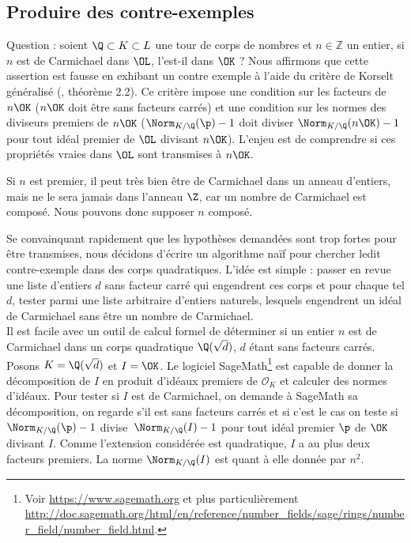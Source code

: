 \documentclass[a4paper, 12pt, oneside]{article}
\begin{document}
\begin{appendix}
\section{Produire des contre-exemples}

Question : soient $\Q \subset K \subset L$ une tour de corps de nombres et $n\in \mathbb{Z}$ un entier, si $n$ est de Carmichael dans $\OL$, l'est-il dans $\OK$ ? Nous affirmons que cette assertion est fausse en exhibant un contre exemple à l'aide du critère de Korselt généralisé (\cite{article}, théorème 2.2). Ce critère impose une condition sur les facteurs de $n\OK$ ($n\OK$ doit être sans facteurs carrés) et une condition sur les normes des diviseurs premiers de $n\OK$ ($\Norm_{K/\Q}(\p)-1$ doit diviser $\Norm_{K/\Q}(n\OK) - 1$ pour tout idéal premier de $\OL$ divisant $n\OK$). L'enjeu est de comprendre si ces propriétés vraies dans $\OL$ sont transmises à $n\OK$.

\begin{remarque}Si $n$ est premier, il peut très bien être de Carmichael dans un anneau d'entiers, mais ne le sera jamais dans l'anneau $\Z$, car un nombre de Carmichael est composé. Nous pouvons donc supposer $n$ composé. \end{remarque}

Se convainquant rapidement que les hypothèses demandées sont trop fortes pour être transmises, nous décidons d'écrire un algorithme naïf pour chercher ledit contre-exemple dans des corps quadratiques. L'idée est simple : passer en revue une liste d'entiers $d$ sans facteur carré qui engendrent ces corps et pour chaque tel $d$, tester parmi une liste arbitraire d'entiers naturels, lesquels engendrent un idéal de Carmichael sans être un nombre de Carmichael. \\

Il est facile avec un outil de calcul formel de déterminer si un entier $n$ est de Carmichael dans un corps quadratique $\Q(\sqrt{d})$, $d$ étant sans facteurs carrés. Posons $K=\Q(\sqrt{d})$ et $I = \OK$. Le logiciel SageMath\footnote{Voir \url{https://www.sagemath.org} et plus particulièrement \url{http://doc.sagemath.org/html/en/reference/number_fields/sage/rings/number_field/number_field.html}.} est capable de donner la décomposition de $I$ en produit d'idéaux premiers de $\mathcal{O}_K$ et calculer des normes d'idéaux. Pour tester si $I$ est de Carmichael, on demande à SageMath sa décomposition, on regarde s'il est sans facteurs carrés et si c'est le cas on teste si $\Norm_{K/\Q}(\p) - 1$ divise $\Norm_{K/\Q}(I) - 1$ pour tout idéal premier $\p$ de $\OK$ divisant $I$. Comme l'extension considérée est quadratique, $I$ a au plus deux facteurs premiers. La norme $\Norm_{K/\Q}(I)$ est quant à elle donnée par $n^2$. \\


\end{appendix}
\end{document}
